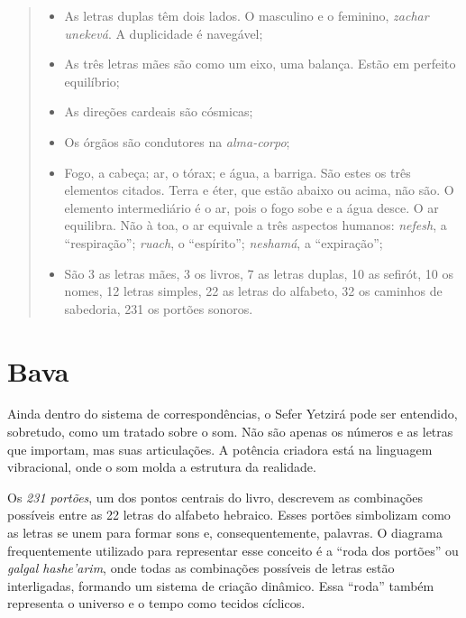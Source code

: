 \asterisc

\begin{quote}
\begin{itemize}
\item{}\quad As letras duplas têm dois lados. O masculino e o feminino, \textit{zachar unekevá}. A duplicidade é navegável;\\
\item{}\quad As três letras mães são como um eixo, uma balança. Estão em perfeito equilíbrio;\\
\item{}\quad As direções cardeais são cósmicas;\\
\item{}\quad Os órgãos são condutores na \textit{alma-corpo};\\
\item{}\quad Fogo, a cabeça; ar, o tórax; e água, a barriga. São estes os três elementos citados. Terra e éter, que estão abaixo ou acima, não são. O elemento intermediário é o ar, pois o fogo sobe e a água desce. O ar equilibra. Não à toa, o ar equivale a três aspectos humanos: \textit{nefesh}, a ``respiração''; \textit{ruach}, o ``espírito''; \textit{neshamá}, a ``expiração'';\\
\item{}\quad São 3 as letras mães, 3 os livros, 7 as letras duplas, 10 as sefirót, 10 os nomes, 12 letras simples, 22 as letras do alfabeto, 32 os caminhos de sabedoria, 231 os portões sonoros. 
\end{itemize}
\end{quote}

\chapter*{Bava \smallskip{}}

Ainda dentro do sistema de correspondências, o Sefer Yetzirá pode ser entendido, sobretudo, como um tratado sobre o som. Não são apenas os números e as letras que importam, mas suas articulações. A potência criadora está na linguagem vibracional, onde o som molda a estrutura da realidade.

Os \textit{231 portões}, um dos pontos centrais do livro, descrevem as combinações possíveis entre as 22 letras do alfabeto hebraico. Esses portões simbolizam como as letras se unem para formar sons e, consequentemente, palavras. O diagrama frequentemente utilizado para representar esse conceito é a ``roda dos portões'' ou \textit{galgal hashe'arim}, onde todas as combinações possíveis de letras estão interligadas, formando um sistema de criação dinâmico. Essa ``roda'' também representa o universo e o tempo como tecidos cíclicos.

